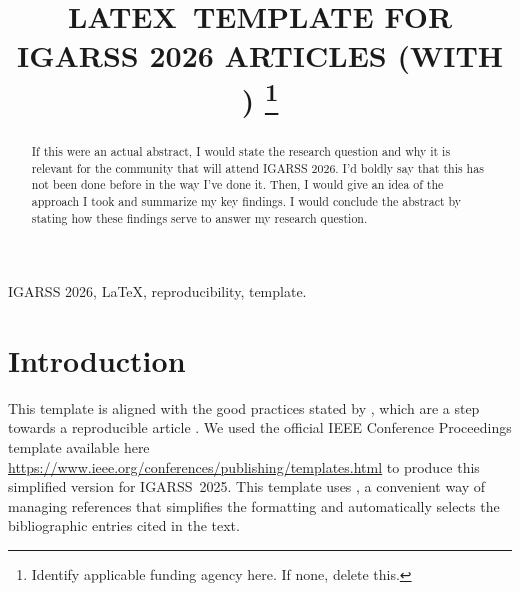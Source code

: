\documentclass[conference,a4paper]{IEEEtran}
\begin{document}
\title{\uppercase{\LaTeX\ Template for IGARSS 2026 Articles (with \BibTeX)}
\thanks{Identify applicable funding agency here. If none, delete this.}
}

\author{	
	\and
	\and
}


\maketitle
\begin{abstract}
	If this were an actual abstract, I would state the research question and why it is relevant for the community that will attend IGARSS 2026. I'd boldly say that this has not been done before in the way I've done it. Then, I would give an idea of the approach I took and summarize my key findings. I would conclude the abstract by stating how these findings serve to answer my research question.
\end{abstract}

\begin{IEEEkeywords}
	IGARSS 2026, \LaTeX, reproducibility, template.
\end{IEEEkeywords}

\section{Introduction}

This template is aligned with the good practices stated by \citet{EditorialGRSL2015}, which are a step towards a reproducible article \citep{ABadgingSystemforReproducibilityandReplicabilityinRemoteSensingResearch}.
We used the official IEEE Conference Proceedings template available here \url{https://www.ieee.org/conferences/publishing/templates.html} to produce this simplified version for IGARSS~2025.
This template uses \BibTeX, a convenient way of managing references that simplifies the formatting and automatically selects the bibliographic entries cited in the text.
\end{document}
